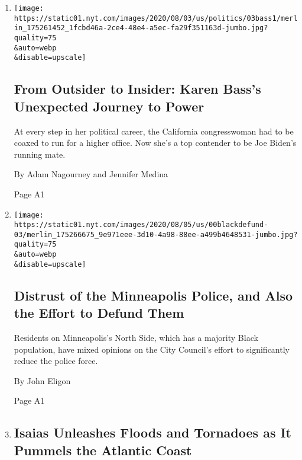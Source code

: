 \begin{enumerate}
\def\labelenumi{\arabic{enumi}.}
\item
  \href{/2020/08/04/us/politics/karen-bass-vice-president-biden.html}{}

  \texttt{[image: https://static01.nyt.com/images/2020/08/03/us/politics/03bass1/merlin\_175261452\_1fcbd46a-2ce4-48e4-a5ec-fa29f351163d-jumbo.jpg?quality=75\\\&auto=webp\\\&disable=upscale]}

  \hypertarget{from-outsider-to-insider-karen-basss-unexpected-journey-to-power}{%
  \subsection{From Outsider to Insider: Karen Bass's Unexpected Journey
  to
  Power}\label{from-outsider-to-insider-karen-basss-unexpected-journey-to-power}}

  At every step in her political career, the California congresswoman
  had to be coaxed to run for a higher office. Now she's a top contender
  to be Joe Biden's running mate.

  By Adam Nagourney and Jennifer Medina

  Page A1
\item
  \href{/2020/08/04/us/minneapolis-defund-police.html}{}

  \texttt{[image: https://static01.nyt.com/images/2020/08/05/us/00blackdefund-03/merlin\_175266675\_9e971eee-3d10-4a98-88ee-a499b4648531-jumbo.jpg?quality=75\\\&auto=webp\\\&disable=upscale]}

  \hypertarget{distrust-of-the-minneapolis-police-and-also-the-effort-to-defund-them}{%
  \subsection{Distrust of the Minneapolis Police, and Also the Effort to
  Defund
  Them}\label{distrust-of-the-minneapolis-police-and-also-the-effort-to-defund-them}}

  Residents on Minneapolis's North Side, which has a majority Black
  population, have mixed opinions on the City Council's effort to
  significantly reduce the police force.

  By John Eligon

  Page A1
\item
  \href{/2020/08/04/us/hurricane-isaias-updates.html}{}

  \hypertarget{isaias-unleashes-floods-and-tornadoes-as-it-pummels-the-atlantic-coast}{%
  \subsection{Isaias Unleashes Floods and Tornadoes as It Pummels the
  Atlantic
  Coast}\label{isaias-unleashes-floods-and-tornadoes-as-it-pummels-the-atlantic-coast}}


\end{enumerate}
